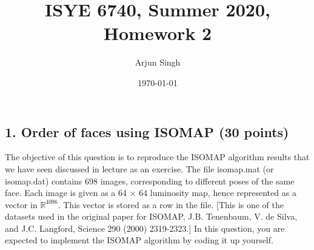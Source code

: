 \documentclass[twoside,10pt]{article}
\begin{document}
\title{ISYE 6740, Summer 2020, Homework 2}
\author{Arjun Singh}
\date{\today}
\maketitle



\subsection*{1. Order of faces using ISOMAP (30 points)}

The objective of this question is to reproduce the ISOMAP algorithm results that we have seen discussed in lecture as an exercise. The file \textsf{isomap.mat} (or \textsf{isomap.dat}) contains 698 images, corresponding to different poses of the same face. Each image is given as a 64 $\times$ 64 luminosity map, hence represented as a vector in $\mathbb R^{4096}$. This vector is stored as a row in the file. [This is one of the datasets used in the original paper for ISOMAP, J.B. Tenenbaum, V. de Silva, and J.C. Langford, Science 290 (2000) 2319-2323.] In this question, you are expected to implement the ISOMAP algorithm by coding it up yourself.
\end{document}
